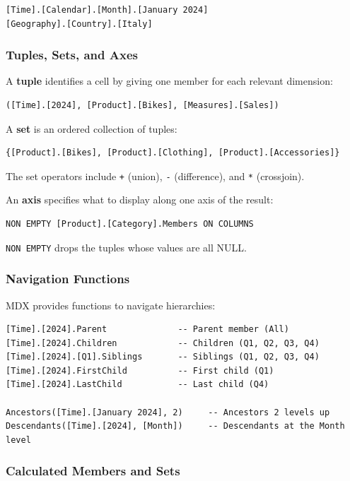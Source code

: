 \begin{lstlisting}
[Time].[Calendar].[Month].[January 2024]
[Geography].[Country].[Italy]
\end{lstlisting}

\subsubsection{Tuples, Sets, and Axes}
\label{subsec:mdx-tuple-set-axis}

A \textbf{tuple} identifies a cell by giving one member for each relevant dimension:
\begin{lstlisting}
([Time].[2024], [Product].[Bikes], [Measures].[Sales])
\end{lstlisting}

A \textbf{set} is an ordered collection of tuples:
\begin{lstlisting}
{[Product].[Bikes], [Product].[Clothing], [Product].[Accessories]}
\end{lstlisting}

The set operators include \texttt{+} (union), \texttt{-} (difference), and \texttt{*} (crossjoin).

An \textbf{axis} specifies what to display along one axis of the result:
\begin{lstlisting}
NON EMPTY [Product].[Category].Members ON COLUMNS
\end{lstlisting}

\texttt{NON EMPTY} drops the tuples whose values are all NULL.

\subsubsection{Navigation Functions}
\label{subsec:mdx-navigation}

MDX provides functions to navigate hierarchies:

\begin{lstlisting}
[Time].[2024].Parent              -- Parent member (All)
[Time].[2024].Children            -- Children (Q1, Q2, Q3, Q4)
[Time].[2024].[Q1].Siblings       -- Siblings (Q1, Q2, Q3, Q4)
[Time].[2024].FirstChild          -- First child (Q1)
[Time].[2024].LastChild           -- Last child (Q4)

Ancestors([Time].[January 2024], 2)     -- Ancestors 2 levels up
Descendants([Time].[2024], [Month])     -- Descendants at the Month level
\end{lstlisting}

\subsubsection{Calculated Members and Sets}
\label{subsec:mdx-calculated}

